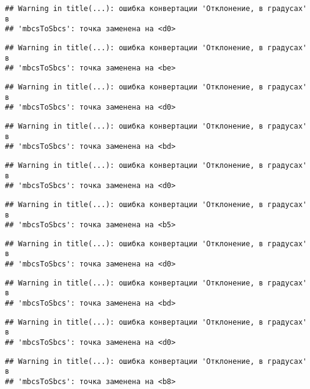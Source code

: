 \documentclass[
]{article}
\begin{document}
\begin{verbatim}
## Warning in title(...): ошибка конвертации 'Отклонение, в градусах' в
## 'mbcsToSbcs': точка заменена на <d0>
\end{verbatim}

\begin{verbatim}
## Warning in title(...): ошибка конвертации 'Отклонение, в градусах' в
## 'mbcsToSbcs': точка заменена на <be>
\end{verbatim}

\begin{verbatim}
## Warning in title(...): ошибка конвертации 'Отклонение, в градусах' в
## 'mbcsToSbcs': точка заменена на <d0>
\end{verbatim}

\begin{verbatim}
## Warning in title(...): ошибка конвертации 'Отклонение, в градусах' в
## 'mbcsToSbcs': точка заменена на <bd>
\end{verbatim}

\begin{verbatim}
## Warning in title(...): ошибка конвертации 'Отклонение, в градусах' в
## 'mbcsToSbcs': точка заменена на <d0>
\end{verbatim}

\begin{verbatim}
## Warning in title(...): ошибка конвертации 'Отклонение, в градусах' в
## 'mbcsToSbcs': точка заменена на <b5>
\end{verbatim}

\begin{verbatim}
## Warning in title(...): ошибка конвертации 'Отклонение, в градусах' в
## 'mbcsToSbcs': точка заменена на <d0>
\end{verbatim}

\begin{verbatim}
## Warning in title(...): ошибка конвертации 'Отклонение, в градусах' в
## 'mbcsToSbcs': точка заменена на <bd>
\end{verbatim}

\begin{verbatim}
## Warning in title(...): ошибка конвертации 'Отклонение, в градусах' в
## 'mbcsToSbcs': точка заменена на <d0>
\end{verbatim}

\begin{verbatim}
## Warning in title(...): ошибка конвертации 'Отклонение, в градусах' в
## 'mbcsToSbcs': точка заменена на <b8>
\end{verbatim}
\end{document}
